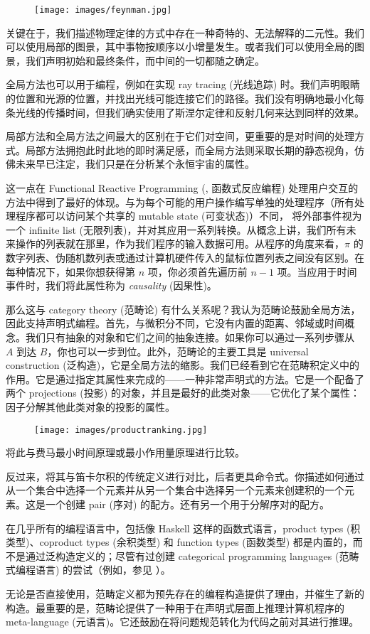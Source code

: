 \begin{figure}[H]
  \centering
  \texttt{[image: images/feynman.jpg]}
\end{figure}

\noindent
关键在于，我们描述物理定律的方式中存在一种奇特的、无法解释的二元性。我们可以使用局部的图景，其中事物按顺序以小增量发生。或者我们可以使用全局的图景，我们声明初始和最终条件，而中间的一切都随之确定。

全局方法也可以用于编程，例如在实现 ray tracing (光线追踪) 时。我们声明眼睛的位置和光源的位置，并找出光线可能连接它们的路径。我们没有明确地最小化每条光线的传播时间，但我们确实使用了斯涅尔定律和反射几何来达到同样的效果。

局部方法和全局方法之间最大的区别在于它们对空间，更重要的是对时间的处理方式。局部方法拥抱此时此地的即时满足感，而全局方法则采取长期的静态视角，仿佛未来早已注定，我们只是在分析某个永恒宇宙的属性。

这一点在 Functional Reactive Programming (, 函数式反应编程) 处理用户交互的方法中得到了最好的体现。与为每个可能的用户操作编写单独的处理程序（所有处理程序都可以访问某个共享的 mutable state (可变状态)）不同， 将外部事件视为一个 infinite list (无限列表)，并对其应用一系列转换。从概念上讲，我们所有未来操作的列表就在那里，作为我们程序的输入数据可用。从程序的角度来看，$\pi$ 的数字列表、伪随机数列表或通过计算机硬件传入的鼠标位置列表之间没有区别。在每种情况下，如果你想获得第 $n$ 项，你必须首先遍历前 $n-1$ 项。当应用于时间事件时，我们将此属性称为 \emph{causality} (因果性)。

那么这与 category theory (范畴论) 有什么关系呢？我认为范畴论鼓励全局方法，因此支持声明式编程。首先，与微积分不同，它没有内置的距离、邻域或时间概念。我们只有抽象的对象和它们之间的抽象连接。如果你可以通过一系列步骤从 $A$ 到达 $B$，你也可以一步到位。此外，范畴论的主要工具是 universal construction (泛构造)，它是全局方法的缩影。我们已经看到它在范畴积定义中的作用。它是通过指定其属性来完成的——一种非常声明式的方法。它是一个配备了两个 projections (投影) 的对象，并且是最好的此类对象——它优化了某个属性：因子分解其他此类对象的投影的属性。

\begin{figure}[H]
  \centering
  \texttt{[image: images/productranking.jpg]}
\end{figure}

\noindent
将此与费马最小时间原理或最小作用量原理进行比较。

反过来，将其与笛卡尔积的传统定义进行对比，后者更具命令式。你描述如何通过从一个集合中选择一个元素并从另一个集合中选择另一个元素来创建积的一个元素。这是一个创建 pair (序对) 的配方。还有另一个用于分解序对的配方。

在几乎所有的编程语言中，包括像 Haskell 这样的函数式语言，product types (积类型)、coproduct types (余积类型) 和 function types (函数类型) 都是内置的，而不是通过泛构造定义的；尽管有过创建 categorical programming languages (范畴式编程语言) 的尝试（例如，参见 ）。

无论是否直接使用，范畴定义都为预先存在的编程构造提供了理由，并催生了新的构造。最重要的是，范畴论提供了一种用于在声明式层面上推理计算机程序的 meta-language (元语言)。它还鼓励在将问题规范转化为代码之前对其进行推理。